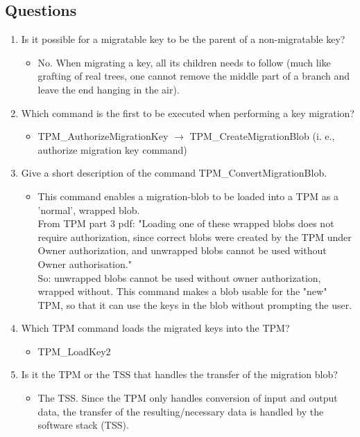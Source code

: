 \documentclass[10pt]{article}
\begin{document}
\subsection{Questions}
\begin{enumerate}
    \item {Is it possible for a migratable key to be the parent of a non-migratable key?} 
	\begin{itemize}
        \item {No. When migrating a key, all its children needs to follow
        (much like grafting of real trees, one cannot remove the middle part
        of a branch and leave the end hanging in the air).}
	\end{itemize}
 
    \item {Which command is the first to be executed when performing a key migration?} 
	\begin{itemize}
	    \item {TPM\_AuthorizeMigrationKey  $\rightarrow$  TPM\_CreateMigrationBlob  (i. e., authorize migration key command)}
	\end{itemize}

    \item {Give a short description of the command TPM\_ConvertMigrationBlob.}
	\begin{itemize}
	    \item {This command enables a migration-blob to be loaded into a TPM as a 'normal', wrapped blob.\\
From TPM part 3 pdf: "Loading one of these wrapped blobs does not require authorization, since correct blobs were created by the TPM under Owner authorization, and unwrapped blobs cannot be used without Owner authorisation." \\
So: unwrapped blobs cannot be used without owner authorization, wrapped without. This command makes a blob usable for the "new" TPM, so that it can use the keys in the blob without prompting the user.}
	\end{itemize}

    \item {Which TPM command loads the migrated keys into the TPM?}
	\begin{itemize}
	    \item {TPM\_LoadKey2}
	\end{itemize}

    \item {Is it the TPM or the TSS that handles the transfer of the migration blob? }
	\begin{itemize}
	    \item {The TSS. Since the TPM only handles conversion of input and output
data, the transfer of the resulting/necessary data is handled by the software
stack (TSS).}
	\end{itemize}
\end{enumerate}
\end{document}
